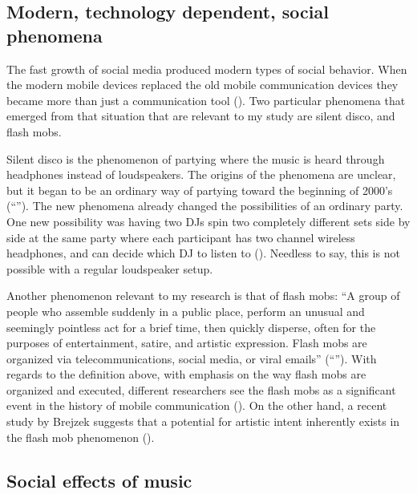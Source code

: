 \subsection{Modern, technology dependent, social phenomena}


The fast growth of social media produced modern types of social behavior. When the modern mobile devices replaced the old mobile communication devices they became more than just a communication tool (\cite{srivastava05}). Two particular phenomena that emerged from that situation that are relevant to my study are silent disco, and flash mobs.

Silent disco is the phenomenon of partying where the music is heard through headphones instead of loudspeakers. The origins of the phenomena are unclear, but it began to be an ordinary way of partying toward the beginning of 2000's (``''). The new phenomena already changed the possibilities of an ordinary party. One new possibility was having two DJs spin two completely different sets side by side at the same party where each participant has two channel wireless headphones, and can decide which DJ to listen to (\cite{web:headphonedisco}). Needless to say, this is not possible with a regular loudspeaker setup.

Another phenomenon relevant to my research is that of flash mobs: ``A group of people who assemble suddenly in a public place, perform an unusual and seemingly pointless act for a brief time, then quickly disperse, often for the purposes of entertainment, satire, and artistic expression. Flash mobs are organized via telecommunications, social media, or viral emails'' (``''). With regards to the definition above, with emphasis on the way flash mobs are organized and executed, different researchers see the flash mobs as a significant event in the history of mobile communication (\cite{nicholson05}). On the other hand, a recent study by Brejzek suggests that a potential for artistic intent inherently exists in the flash mob phenomenon (\cite*{brejzek10}).

\subsection{Social effects of music}


